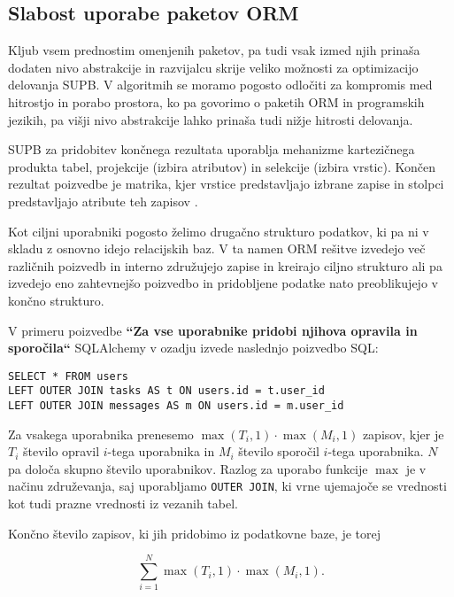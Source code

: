 \documentclass[a4paper,12pt,openright]{book}
\begin{document}
    \subsection{Slabost uporabe paketov ORM}
    Kljub vsem prednostim omenjenih paketov, pa tudi vsak izmed njih prinaša dodaten nivo abstrakcije in razvijalcu skrije veliko možnosti za optimizacijo delovanja SUPB. V algoritmih se moramo pogosto odločiti za kompromis med hitrostjo in porabo prostora, ko pa govorimo o paketih ORM in programskih jezikih, pa višji nivo abstrakcije lahko prinaša tudi nižje hitrosti delovanja.

    SUPB za pridobitev končnega rezultata uporablja mehanizme kartezičnega produkta tabel, projekcije (izbira atributov) in selekcije (izbira vrstic). Kon\-čen rezultat poizvedbe je matrika, kjer vrstice predstavljajo izbrane zapise in stolpci predstavljajo atribute teh zapisov \cite{keller1985algorithms}.
    
    Kot ciljni uporabniki pogosto želimo drugačno strukturo podatkov, ki pa ni v skladu z osnovno idejo relacijskih baz. V ta namen ORM rešitve izvedejo več različnih poizvedb in interno združujejo zapise in kreirajo ciljno strukturo ali pa izvedejo eno zahtevnejšo poizvedbo in pridobljene podatke nato preoblikujejo v končno strukturo.
    
    V primeru poizvedbe \textbf{``Za vse uporabnike pridobi njihova opravila in sporočila``} SQLAlchemy v ozadju izvede naslednjo poizvedbo SQL:
    \begin{verbatim}
SELECT * FROM users
LEFT OUTER JOIN tasks AS t ON users.id = t.user_id
LEFT OUTER JOIN messages AS m ON users.id = m.user_id
    \end{verbatim}

    \noindent
    Za vsakega uporabnika prenesemo $\max(T_i, 1) \cdot \max(M_i, 1)$ zapisov, kjer je $T_i$ število opravil $i$-tega uporabnika in $M_i$ število sporočil $i$-tega uporabnika. $N$ pa določa skupno število uporabnikov. Razlog za uporabo funkcije $\max$ je v načinu združevanja, saj uporabljamo {\tt OUTER JOIN}, ki vrne ujemajoče se vrednosti kot tudi prazne vrednosti iz vezanih tabel. 

    Končno število zapisov, ki jih pridobimo iz podatkovne baze, je torej
    
    \begin{equation}
        \sum_{i=1}^{N} \max(T_i, 1) \cdot \max(M_i, 1).
    \label{data_sum_first}
    \end{equation}
\end{document}
